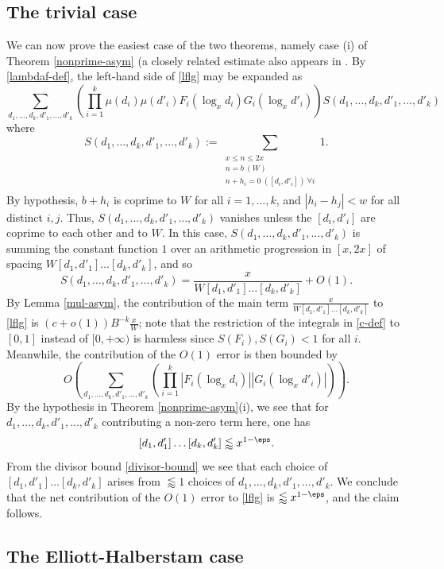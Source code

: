\subsection{The trivial case}\label{triv-sec}

We can now prove the easiest case of the two theorems, namely case (i) of Theorem \ref{nonprime-asym} (a closely related estimate also appears in \cite[Lemma 6.2]{maynard-new}.  By \eqref{lambdaf-def}, the left-hand side of \eqref{lflg} may be expanded as
\begin{equation}\label{lflg-expand}
 \sum_{d_1,\dots,d_k,d'_1,\dots,d'_k} \left(\prod_{i=1}^k \mu(d_i) \mu(d'_i) F_i(\log_x d_i) G_i(\log_x d'_i)\right) S(d_1,\dots,d_k,d'_1,\dots,d'_k)
\end{equation}
where
$$ S(d_1,\dots,d_k,d'_1,\dots,d'_k) := 
 \sum_{\substack{x \leq n \leq 2x\\ n = b\ (W) \\ n + h_i = 0\ ([d_i,d'_i])\ \forall i\\}} 1.
$$
By hypothesis, $b+h_i$ is coprime to $W$ for all $i=1,\dots,k$, and $|h_i-h_j| < w$ for all distinct $i,j$.  Thus, $S(d_1,\dots,d_k,d'_1,\dots,d'_k)$ vanishes unless the $[d_i,d'_i]$ are coprime to each other and to $W$.  In this case, $S(d_1,\dots,d_k,d'_1,\dots,d'_k)$ is summing the constant function $1$ over an arithmetic progression in $[x,2x]$ of spacing $W [d_1,d'_1] \dots [d_k,d'_k]$, and so  
$$ S(d_1,\dots,d_k,d'_1,\dots,d'_k) = \frac{x}{W [d_1,d'_1] \dots [d_k,d'_k]} + O(1).$$
By Lemma \ref{mul-asym}, the contribution of the main term
$\frac{x}{W [d_1,d'_1] \dots [d_k,d'_k]}$ to \eqref{lflg} is $(c+o(1)) B^{-k} \frac{x}{W}$; note that the restriction of the integrals in \eqref{c-def} to $[0,1]$ instead of $[0,+\infty)$ is harmless since $S(F_i), S(G_i) < 1$ for all $i$.  Meanwhile, the contribution of the $O(1)$ error is then bounded by
$$
O( \sum_{d_1,\dots,d_k,d'_1,\dots,d'_k} (\prod_{i=1}^k |F_i(\log_x d_i)| |G_i(\log_x d'_i)|)).$$
By the hypothesis in Theorem \ref{nonprime-asym}(i), we see that for $d_1,\dots,d_k,d'_1,\dots,d'_k$ contributing a non-zero term here, one has
$$
[d_1,d'_1] \dots [d_k,d'_k] \lessapprox x^{1-\eps}.$$
From the divisor bound \eqref{divisor-bound} we see that each choice of $[d_1,d'_1] \dots [d_k,d'_k]$ arises from $\lessapprox 1$ choices of $d_1,\dots,d_k,d'_1,\dots,d'_k$.  We conclude that the net contribution of the $O(1)$ error to \eqref{lflg} is $\lessapprox x^{1-\eps}$, and the claim follows.

\subsection{The Elliott-Halberstam case}\label{eh-case}

